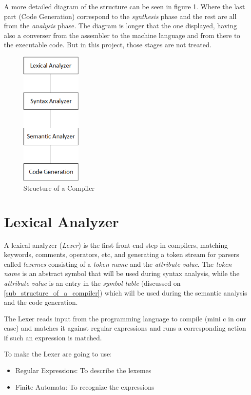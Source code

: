 \documentclass[conference]{IEEEtran}
\begin{document}
A more detailed diagram of the structure can be seen in figure \ref{fig_struct_of_compilator}. Where the last part (Code Generation) correspond to the \textit{synthesis} phase and the rest are all from the \textit{analysis} phase. The diagram is longer that the one displayed, having also a converser from the assembler to the machine language and from there to the executable code. But in this project, those stages are not treated.

\begin{figure}[H]
\centering
\includegraphics[width=3cm]{images/Diagram.png}
\caption{Structure of a Compiler}
\label{fig_struct_of_compilator}
\end{figure}

\section{Lexical Analyzer} \label{sec:lexical-Analizer}
A lexical analyzer (\textit{Lexer}) is the first front-end step in compilers, matching keywords, comments, operators, etc, and generating a token stream for parsers called \textit{lexemes} consisting of a \textit{token name} and the \textit{attribute value}. 
The \textit{token name} is an abstract symbol that will be used during syntax analysis, while the \textit{attribute value} is an entry in the \textit{symbol table} (discussed on \ref{sub_structure_of_a_compiler}) which will be used during the semantic analysis and the code generation.

The Lexer reads input from the programming language to compile (mini c in our case) and matches it against regular expressions and runs a corresponding action if such an expression is matched.

To make the Lexer are going to use:
\begin{itemize}
	\item Regular Expressions: To describe the lexemes
	\item Finite Automata: To recognize the expressions
\end{itemize}
\end{document}
